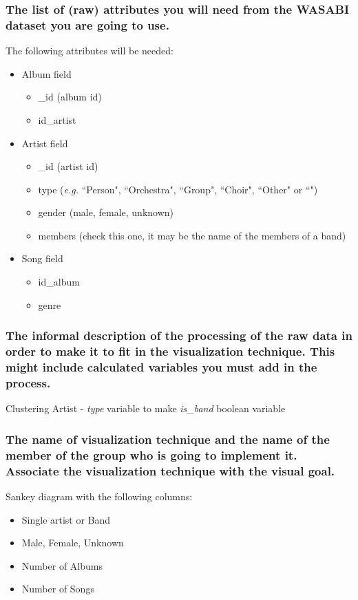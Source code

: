 \documentclass[a4paper, 11pt, oneside]{article}
\begin{document}
\subsubsection*{The list of (raw) attributes you will need from the WASABI dataset you are going to use.}
The following attributes will be needed:
\begin{itemize}
    \item Album field
          \begin{itemize}
              \item \_id (album id)
              \item id\_artist
          \end{itemize}
    \item Artist field
          \begin{itemize}
              \item \_id (artist id)
              \item type (\textit{e.g.} ``Person", ``Orchestra", ``Group", ``Choir", ``Other" or ``")
              \item gender (male, female, unknown)
              \item members (check this one, it may be the name of the members of a band)
          \end{itemize}
    \item Song field
          \begin{itemize}
              \item id\_album
              \item genre
          \end{itemize}
\end{itemize}
\subsubsection*{The informal description of the processing of the raw data in order to make it to fit in the visualization technique. This might include calculated variables you must add in the process.}
Clustering Artist - \textit{type} variable to make \textit{is\_band} boolean variable


\subsubsection*{The name of visualization technique and the name of the member of the group who is going to implement it. Associate the visualization technique with the visual goal.}
Sankey diagram with the following columns:
\begin{itemize}
    \item Single artist or Band
    \item Male, Female, Unknown
    \item Number of Albums
    \item Number of Songs
\end{itemize}
\end{document}
